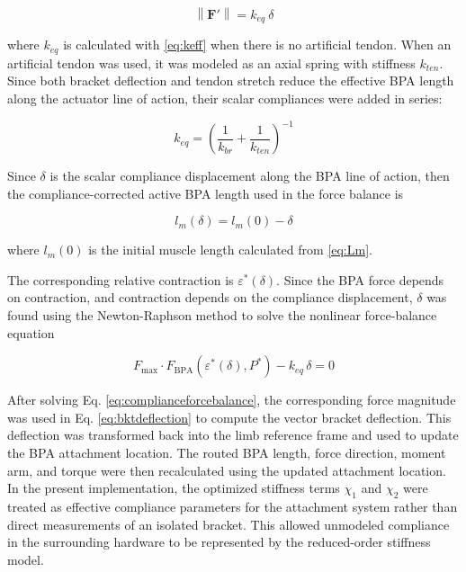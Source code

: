 \begin{equation} \left\| \mathbf{F}' \right\| = k_{eq} \: \delta
\label{eq:hookereduced}
\end{equation}

where $k_{eq}$ is calculated with \eqref{eq:keff} when there is no artificial tendon. When an artificial tendon was used, it was modeled as an axial spring with stiffness $k_{ten}$. Since both bracket deflection and tendon stretch reduce the effective BPA length along the actuator line of action, their scalar compliances were added in series:

\begin{equation} k_{eq} = \left( \frac{1}{k_{br}} + \frac{1}{k_{ten}} \right)^{-1}
\label{eq:equivalentstiffness}
\end{equation}

Since $\delta$ is the scalar compliance displacement along the BPA line of action, then the compliance-corrected active BPA length used in the force balance is

\begin{equation} l_m(\delta) = l_m{(0)} - \delta
\label{eq:activelengthcorrected}
\end{equation}

where $l_m{(0)}$ is the initial muscle length calculated from \eqref{eq:Lm}.

The corresponding relative contraction is $\varepsilon^*(\delta)$. Since the BPA force depends on contraction, and contraction depends on the compliance displacement, $\delta$ was found using the Newton-Raphson method to solve the nonlinear force-balance equation

\begin{equation} F_{\mathrm{max}} \cdot F_{\mathrm{BPA}}\!\left(\varepsilon^*(\delta),P^*\right) - k_{eq}\,\delta = 0
\label{eq:complianceforcebalance}
\end{equation}

After solving Eq. \ref{eq:complianceforcebalance}, the corresponding force magnitude was used in Eq. \ref{eq:bktdeflection} to compute the vector bracket deflection. This deflection was transformed back into the limb reference frame and used to update the BPA attachment location. The routed BPA length, force direction, moment arm, and torque were then recalculated using the updated attachment location. In the present implementation, the optimized stiffness terms $\chi_{1}$ and $\chi_{2}$ were treated as effective compliance parameters for the attachment system rather than direct measurements of an isolated bracket. This allowed unmodeled compliance in the surrounding hardware to be represented by the reduced-order stiffness model.



